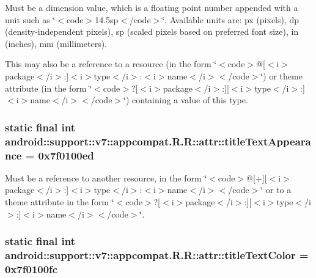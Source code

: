 Must be a dimension value, which is a floating point number appended with a unit such as \char`\"{}$<$code$>$14.5sp$<$/code$>$\char`\"{}. Available units are: px (pixels), dp (density-independent pixels), sp (scaled pixels based on preferred font size), in (inches), mm (millimeters). 

This may also be a reference to a resource (in the form \char`\"{}$<$code$>$@\mbox{[}$<$i$>$package$<$/i$>$:\mbox{]}$<$i$>$type$<$/i$>$:$<$i$>$name$<$/i$>$$<$/code$>$\char`\"{}) or theme attribute (in the form \char`\"{}$<$code$>$?\mbox{[}$<$i$>$package$<$/i$>$:\mbox{]}\mbox{[}$<$i$>$type$<$/i$>$:\mbox{]}$<$i$>$name$<$/i$>$$<$/code$>$\char`\"{}) containing a value of this type. \hypertarget{classandroid_1_1support_1_1v7_1_1appcompat_1_1_r_1_1attr_6f05d0e74c02a71af70bfc9a39bd130e}{
\subsubsection[{titleTextAppearance}]{\setlength{\rightskip}{0pt plus 5cm}static final int android::support::v7::appcompat.R.R::attr::titleTextAppearance = 0x7f0100ed}}
\label{classandroid_1_1support_1_1v7_1_1appcompat_1_1_r_1_1attr_6f05d0e74c02a71af70bfc9a39bd130e}


Must be a reference to another resource, in the form \char`\"{}$<$code$>$@\mbox{[}+\mbox{]}\mbox{[}$<$i$>$package$<$/i$>$:\mbox{]}$<$i$>$type$<$/i$>$:$<$i$>$name$<$/i$>$$<$/code$>$\char`\"{} or to a theme attribute in the form \char`\"{}$<$code$>$?\mbox{[}$<$i$>$package$<$/i$>$:\mbox{]}\mbox{[}$<$i$>$type$<$/i$>$:\mbox{]}$<$i$>$name$<$/i$>$$<$/code$>$\char`\"{}. \hypertarget{classandroid_1_1support_1_1v7_1_1appcompat_1_1_r_1_1attr_2f894be8b685eca1a17462846085cf18}{
\subsubsection[{titleTextColor}]{\setlength{\rightskip}{0pt plus 5cm}static final int android::support::v7::appcompat.R.R::attr::titleTextColor = 0x7f0100fc}}
\label{classandroid_1_1support_1_1v7_1_1appcompat_1_1_r_1_1attr_2f894be8b685eca1a17462846085cf18}


